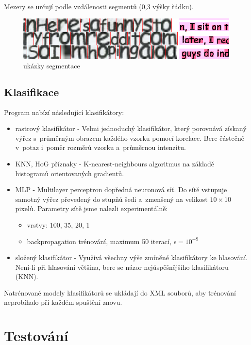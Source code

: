 \documentclass[12pt]{article}
\begin{document}
Mezery se určují podle vzdálenosti segmentů (0,3 výšky řádku).

\begin{figure}[htb]
  \centering
  \includegraphics[width=13.5cm,keepaspectratio]{cutouts.png}
  \caption{ukázky segmentace}
\end{figure}

\subsection{Klasifikace}

Program nabízí následující klasifikátory:

\begin{itemize}
  \item rastrový klasifikátor \cite{ocr} - Velmi jednoduchý klasifikátor, který porovnává získaný výřez s~průměrným obrazem každého vzorku pomocí korelace. Bere částečně v~potaz i~poměr rozměrů vzorku a~průměrnou intenzitu.
  \item KNN, HoG příznaky - K-nearest-neighbours algoritmus na základě histogramů orientovaných gradientů.
  \item MLP - Multilayer perceptron dopředná neuronová síť. Do sítě vstupuje samotný výřez převedený do stupňů šedi a~zmenšený na velikost $10 \times 10$ pixelů. Parametry sítě jsme nalezli experimentálně: 
    \begin{itemize}
      \item vrstvy: 100, 35, 20, 1
      \item backpropagation trénování, maximum 50 iterací, $\epsilon = 10^{-9}$
    \end{itemize}
  \item složený klasifikátor - Využívá všechny výše zmíněné klasifikátory ke hlasování. Není-li při hlasování většina, bere se názor nejúspěšnějšího klasifikátoru (KNN).
\end{itemize}

Natrénované modely klasifikátorů se ukládají do XML souborů, aby trénování neprobíhalo při každém spuštění znovu.

\section{Testování}
\end{document}
